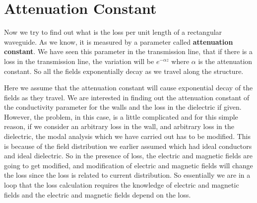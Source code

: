 \section{Attenuation Constant}
Now we try to find out what is the loss per unit length of a rectangular waveguide. As we know, it is measured by a parameter called \textbf{attenuation constant}. We have seen this parameter in the transmission line, that if there is a loss in the transmission line, the variation will be $e^{-\alpha z}$ where $\alpha$ is the attenuation constant. So all the fields exponentially decay as we travel along the structure. 

Here we assume that the attenuation constant will cause exponential decay of the fields as they travel. We are interested in finding out the attenuation constant of the conductivity parameter for the walls and the loss in the dielectric if given. However, the problem, in this case, is a little complicated and for this simple reason, if we consider an arbitrary loss in the wall, and arbitrary loss in the dielectric, the modal analysis which we have carried out has to be modified. This is because of the field distribution we earlier assumed which had ideal conductors and ideal dielectric. So in the presence of loss, the electric and magnetic fields are going to get modified, and modification of electric and magnetic fields will change the loss since the loss is related to current distribution. So essentially we are in a loop that the loss calculation requires the knowledge of electric and magnetic fields and the electric and magnetic fields depend on the loss.
	

